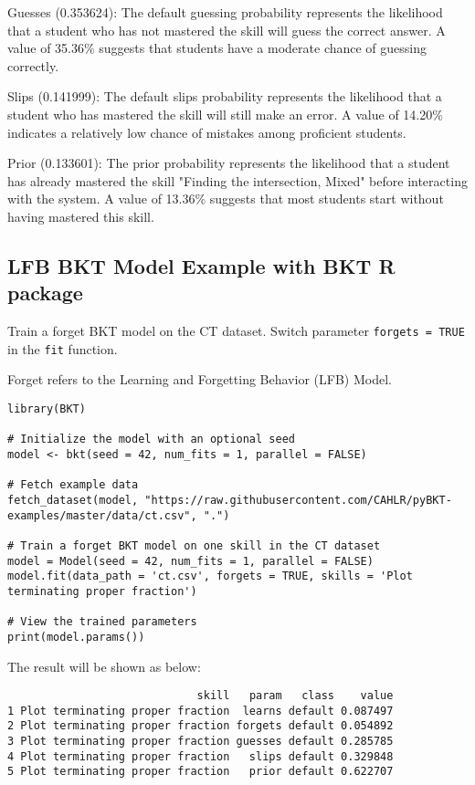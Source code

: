 \documentclass{article}
\begin{document}
Guesses (0.353624): The default guessing probability represents the likelihood that a student who has not mastered the skill will guess the correct answer. A value of 35.36\% suggests that students have a moderate chance of guessing correctly.

Slips (0.141999): The default slips probability represents the likelihood that a student who has mastered the skill will still make an error. A value of 14.20\% indicates a relatively low chance of mistakes among proficient students.

Prior (0.133601): The prior probability represents the likelihood that a student has already mastered the skill "Finding the intersection, Mixed" before interacting with the system. A value of 13.36\% suggests that most students start without having mastered this skill.

\subsection{LFB BKT Model Example with BKT R package}

Train a forget BKT model on the CT dataset. Switch parameter \texttt{forgets = TRUE} in the \texttt{fit} function. 

Forget refers to the Learning and Forgetting Behavior (LFB) Model.

\begin{lstlisting}[caption={R code to train a LFB BKT model}]
library(BKT)

# Initialize the model with an optional seed
model <- bkt(seed = 42, num_fits = 1, parallel = FALSE)

# Fetch example data
fetch_dataset(model, "https://raw.githubusercontent.com/CAHLR/pyBKT-examples/master/data/ct.csv", ".")

# Train a forget BKT model on one skill in the CT dataset
model = Model(seed = 42, num_fits = 1, parallel = FALSE)
model.fit(data_path = 'ct.csv', forgets = TRUE, skills = 'Plot terminating proper fraction')

# View the trained parameters
print(model.params())
\end{lstlisting}

The result will be shown as below:

\begin{verbatim}
                             skill   param   class    value
1 Plot terminating proper fraction  learns default 0.087497
2 Plot terminating proper fraction forgets default 0.054892
3 Plot terminating proper fraction guesses default 0.285785
4 Plot terminating proper fraction   slips default 0.329848
5 Plot terminating proper fraction   prior default 0.622707
\end{verbatim}
\end{document}
